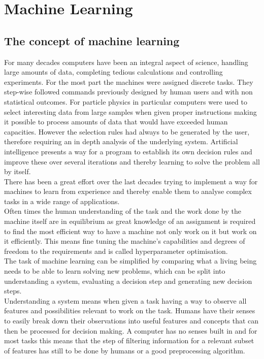 \chapter{Machine Learning}

\section{The concept of machine learning}

For many decades computers have been an integral aspect of science, handling large amounts of data, completing tedious calculations and controlling experiments. For the most part the  machines were assigned discrete tasks. They step-wise followed commands previously designed by human users and with non statistical outcomes. 
For particle physics in particular computers were used to select interesting data from large samples when given proper instructions making it possible to process amounts of data that would have exceeded human capacities. However the selection rules had always to be generated by the user, therefore requiring an in depth analysis of the underlying system. Artificial intelligence presents a way for a program to establish its own decision rules and improve these over several iterations and thereby learning to solve the problem all by itself.\\
There has been a great effort over the last decades trying to implement a way for machines to learn from experience and thereby enable them to analyse complex tasks in a wide range of applications.\\
Often times the human understanding of the task and the work done by the machine itself are in equilibrium as great knowledge of an assignment is required to find the most efficient way to have a machine not only work on it but work on it efficiently. This means fine tuning the machine's capabilities and degrees of freedom to the requirements and is called hyperparameter optimisation.\\
The task of machine learning can be simplified by comparing what a living being needs to be able to learn solving new problems, which can be split into understanding a system, evaluating a decision step and generating new decision steps.\\
Understanding a system means when given a task having a way to observe all features and possibilities relevant to work on the task. Humans have their senses to easily break down their observations into useful features and concepts that can then be processed for decision making. A computer has no senses built in and for most tasks this means that the step of filtering information for a relevant subset of features has still to be done by humans or a good preprocessing algorithm.\\
